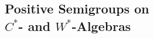 % 
%
%

\begin{partbacktext}
\part[Positive Semigroups on $C^{*}$- and $W^{*}$-Algebras]{Positive Semigroups on \\$C^{*}$- and $W^{*}$-Algebras}
\end{partbacktext}